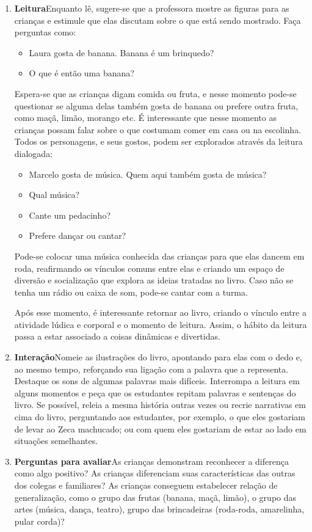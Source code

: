 \documentclass[11pt]{extarticle}
\begin{document}
\begin{enumerate}
\item \textbf{Leitura}\quad Enquanto lê, sugere-se que a professora mostre as figuras para as crianças e estimule que elas discutam sobre o que está sendo mostrado.
Faça perguntas como:

\begin{itemize}
\item Laura gosta de banana. Banana é um brinquedo?
\item O que é então uma banana?
\end{itemize}


Espera-se que as crianças digam comida ou fruta, e nesse momento pode-se questionar se alguma delas também gosta de banana ou prefere outra fruta, como maçã, limão, morango etc. É interessante que nesse momento as crianças possam falar sobre o que costumam comer em casa ou na escolinha.
Todos os personagens, e seus gostos, podem ser explorados através da leitura dialogada:

\begin{itemize}
\item Marcelo gosta de música. Quem aqui também gosta de música?
\item Qual música?
\item Cante um pedacinho?
\item Prefere dançar ou cantar?
\end{itemize}

Pode-se colocar uma música conhecida das crianças para que elas dancem em roda, reafirmando os vínculos comuns entre elas e criando um espaço de diversão e socialização que explora as ideias tratadas no livro. Caso não se tenha um rádio ou caixa de som, pode-se cantar com a turma.

Após esse momento, é interessante retornar ao livro, criando o vínculo entre a atividade lúdica e corporal e o momento de leitura. Assim, o hábito da leitura passa a estar associado a coisas dinâmicas e divertidas.

\item \textbf{Interação}\quad Nomeie as ilustrações 
do livro, apontando para elas com o dedo e, ao mesmo tempo, reforçando sua ligação com a palavra que a representa. Destaque os sons de algumas 
palavras mais difíceis. Interrompa a leitura em alguns momentos e peça que 
os estudantes repitam palavras e sentenças do livro. Se possível, 
releia a mesma história outras vezes ou recrie narrativas em cima do livro, perguntando aos estudantes, por exemplo, o que eles gostariam de levar ao Zeca machucado; ou com quem eles gostariam de estar ao lado em situações semelhantes.

\item \textbf{Perguntas para avaliar}\quad As crianças demonstram reconhecer a diferença como algo positivo? As crianças diferenciam suas características das outras dos colegas e familiares? As crianças conseguem estabelecer relação de generalização, como o grupo das frutas (banana, maçã, limão), o grupo das artes (música, dança, teatro), grupo das brincadeiras (roda-roda, amarelinha, pular corda)? 
\end{enumerate}
\end{document}
